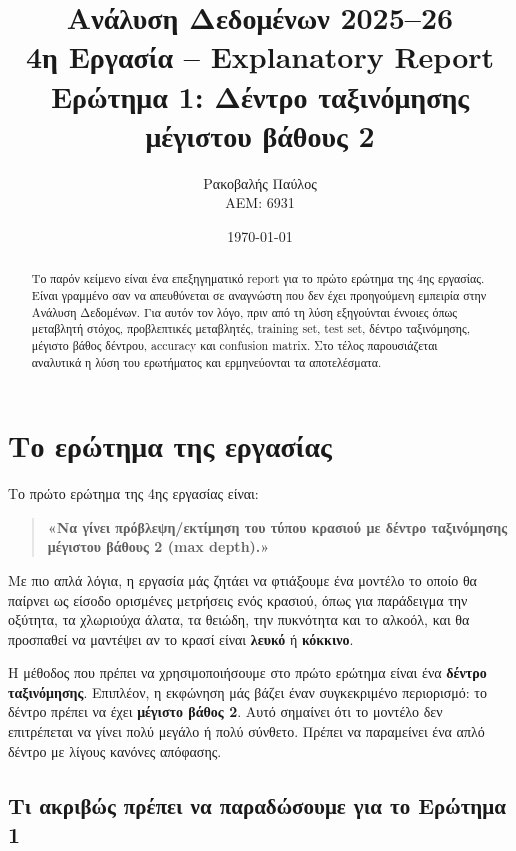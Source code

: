 \documentclass[12pt,a4paper]{article}
\title{
    \textbf{Ανάλυση Δεδομένων 2025--26}\\[0.25cm]
    \Large 4η Εργασία -- Explanatory Report\\[0.15cm]
    \large Ερώτημα 1: Δέντρο ταξινόμησης μέγιστου βάθους 2
}
\author{
    Ρακοβαλής Παύλος\\
    ΑΕΜ: 6931
}
\date{\today}
\begin{document}
\maketitle
\thispagestyle{fancy}

\begin{abstract}
Το παρόν κείμενο είναι ένα επεξηγηματικό report για το πρώτο ερώτημα της
4ης εργασίας. Είναι γραμμένο σαν να απευθύνεται σε αναγνώστη που δεν έχει
προηγούμενη εμπειρία στην Ανάλυση Δεδομένων. Για αυτόν τον λόγο, πριν από τη
λύση εξηγούνται έννοιες όπως μεταβλητή στόχος, προβλεπτικές μεταβλητές,
training set, test set, δέντρο ταξινόμησης, μέγιστο βάθος δέντρου, accuracy
και confusion matrix. Στο τέλος παρουσιάζεται αναλυτικά η λύση του ερωτήματος
και ερμηνεύονται τα αποτελέσματα.
\end{abstract}

\tableofcontents
\newpage

\section{Το ερώτημα της εργασίας}

Το πρώτο ερώτημα της 4ης εργασίας είναι:

\begin{quote}
\textbf{«Να γίνει πρόβλεψη/εκτίμηση του τύπου κρασιού με δέντρο ταξινόμησης
μέγιστου βάθους 2 (max depth).»}
\end{quote}

Με πιο απλά λόγια, η εργασία μάς ζητάει να φτιάξουμε ένα μοντέλο το οποίο θα
παίρνει ως είσοδο ορισμένες μετρήσεις ενός κρασιού, όπως για παράδειγμα την
οξύτητα, τα χλωριούχα άλατα, τα θειώδη, την πυκνότητα και το αλκοόλ, και θα
προσπαθεί να μαντέψει αν το κρασί είναι \textbf{λευκό} ή \textbf{κόκκινο}.

Η μέθοδος που πρέπει να χρησιμοποιήσουμε στο πρώτο ερώτημα είναι ένα
\textbf{δέντρο ταξινόμησης}. Επιπλέον, η εκφώνηση μάς βάζει έναν συγκεκριμένο
περιορισμό: το δέντρο πρέπει να έχει \textbf{μέγιστο βάθος 2}. Αυτό σημαίνει
ότι το μοντέλο δεν επιτρέπεται να γίνει πολύ μεγάλο ή πολύ σύνθετο. Πρέπει να
παραμείνει ένα απλό δέντρο με λίγους κανόνες απόφασης.

\subsection{Τι ακριβώς πρέπει να παραδώσουμε για το Ερώτημα 1}
\end{document}
